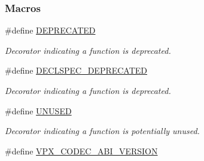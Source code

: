 \subsubsection*{Macros}
\begin{DoxyCompactItemize}
\item 
\#define \hyperlink{group__codec_gac1e8a42306d8e67cb94ca31c3956ee78}{D\+E\+P\+R\+E\+C\+A\+T\+ED}\hypertarget{group__codec_gac1e8a42306d8e67cb94ca31c3956ee78}{}\label{group__codec_gac1e8a42306d8e67cb94ca31c3956ee78}

\begin{DoxyCompactList}\small\item\em Decorator indicating a function is deprecated. \end{DoxyCompactList}\item 
\#define \hyperlink{group__codec_gab61b56b074706ee8423d864b511212ad}{D\+E\+C\+L\+S\+P\+E\+C\+\_\+\+D\+E\+P\+R\+E\+C\+A\+T\+ED}
\begin{DoxyCompactList}\small\item\em Decorator indicating a function is deprecated. \end{DoxyCompactList}\item 
\#define \hyperlink{group__codec_gaddf5ec070e9499d36b7f2009ce736076}{U\+N\+U\+S\+ED}\hypertarget{group__codec_gaddf5ec070e9499d36b7f2009ce736076}{}\label{group__codec_gaddf5ec070e9499d36b7f2009ce736076}

\begin{DoxyCompactList}\small\item\em Decorator indicating a function is potentially unused. \end{DoxyCompactList}\item 
\#define \hyperlink{group__codec_gaf7e9cad2df0f81679b881f46740ad097}{V\+P\+X\+\_\+\+C\+O\+D\+E\+C\+\_\+\+A\+B\+I\+\_\+\+V\+E\+R\+S\+I\+ON}\hypertarget{group__codec_gaf7e9cad2df0f81679b881f46740ad097}{}\label{group__codec_gaf7e9cad2df0f81679b881f46740ad097}


\end{DoxyCompactItemize}
